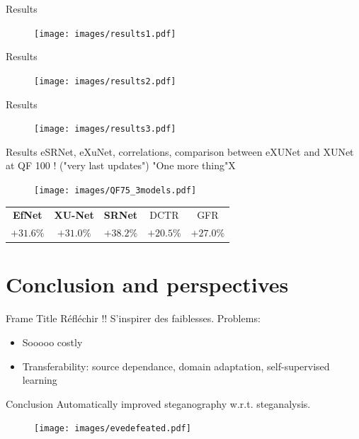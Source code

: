 \documentclass[10pt]{beamer}
\begin{document}
\begin{frame}{Results}
    \begin{figure}
        \texttt{[image: images/results1.pdf]}
    \end{figure}
\end{frame}

\begin{frame}{Results}
    \begin{figure}
        \texttt{[image: images/results2.pdf]}
    \end{figure}
\end{frame}

\begin{frame}{Results}
    \begin{figure}
        \texttt{[image: images/results3.pdf]}
    \end{figure}
\end{frame}

\begin{frame}{Results}
eSRNet, eXuNet, correlations, comparison between eXUNet and XUNet at QF 100 ! ("very last updates")
"One more thing"X

    \begin{figure}[h]
        \texttt{[image: images/QF75\_3models.pdf]}
    \end{figure}
    \pause
    \begin{center}
        \begin{tabular}{ccccc}
           \textbf{EfNet} & \textbf{XU-Net} & \textbf{SRNet} & DCTR & GFR \\
           \alert{$+31.6 \%$} & \alert{$+31.0\%$} & \alert{$+38.2 \%$} & $+20.5\%$ & $+27.0 \%$
        \end{tabular}
    \end{center}
    
\end{frame}


\section{Conclusion and perspectives}

\begin{frame}{Frame Title}
    Réfléchir !! S'inspirer des faiblesses. 
    Problems:
    \begin{itemize}
        \item Sooooo costly
        \item Transferability: source dependance, domain adaptation, self-supervised learning

    \end{itemize}

\end{frame}



\begin{frame}{Conclusion}
    Automatically improved steganography w.r.t. steganalysis. 
    \begin{figure}[h]
        \texttt{[image: images/evedefeated.pdf]}
    \end{figure}
\end{frame}




\end{document}
